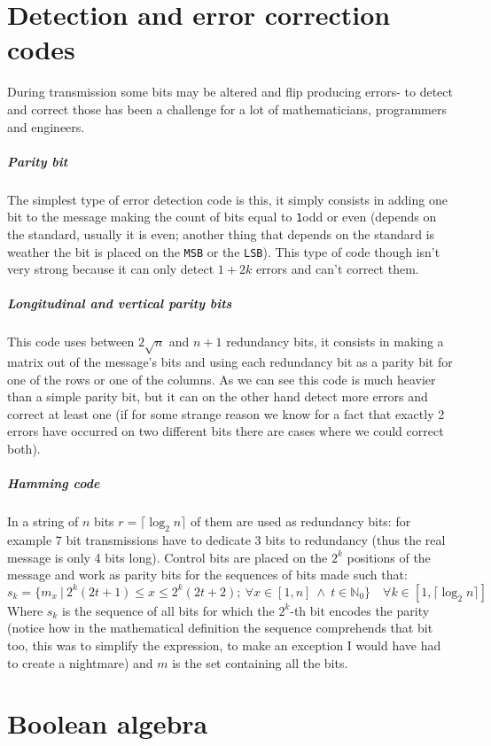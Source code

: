 \documentclass{scrartcl}
\newcommand{\one}{\texttt{1}}
\begin{document}
    \section{Detection and error correction codes}
    During transmission some bits may be altered and flip producing errors- to detect and correct those has been a challenge for a lot of mathematicians, programmers and engineers.
    \subparagraph{Parity bit} The simplest type of error detection code is this, it simply consists in adding one bit to the message making the count of bits equal to \one odd or even (depends on the standard, usually it is even; another thing that depends on the standard is weather the bit is placed on the \texttt{MSB} or the \texttt{LSB}). This type of code though isn't very strong because it can only detect $1+2k$ errors and can't correct them.
    \subparagraph{Longitudinal and vertical parity bits} This code uses between $2\sqrt{n}$ and $n+1$ redundancy bits, it consists in making a matrix out of the message's bits and using each redundancy bit as a parity bit for one of the rows or one of the columns. As we can see this code is much heavier than a simple parity bit, but it can on the other hand detect more errors and correct at least one (if for some strange reason we know for a fact that exactly 2 errors have occurred on two different bits there are cases where we could correct both).
    \subparagraph{Hamming code} In a string of $n$ bits $r=\lceil\log_2{n}\rceil$ of them are used as redundancy bits: for example 7 bit transmissions have to dedicate 3 bits to redundancy (thus the real message is only 4 bits long). Control bits are placed on the $2^k$ positions of the message and work as parity bits for the sequences of bits made such that:
    \begin{equation*}
        s_k=\{m_x\ |\ 2^k(2t+1)\le x \le 2^k(2t+2);\ \forall x \in [1,n] \ \land\ t \in \mathbb{N}_0\}\quad \forall k \in [1,\lceil\log_2{n}\rceil]
    \end{equation*} Where $s_k$ is the sequence of all bits for which the $2^k$-th bit encodes the parity (notice how in the mathematical definition the sequence comprehends that bit too, this was to simplify the expression, to make an exception I would have had to create a nightmare) and $m$ is the set containing all the bits.
    \section{Boolean algebra}
\end{document}
